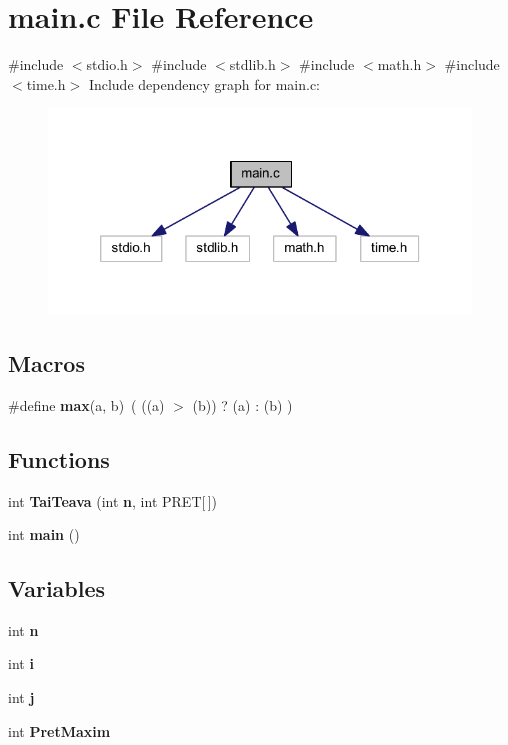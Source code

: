 \section{main.\+c File Reference}
\label{main_8c}
{\ttfamily \#include $<$stdio.\+h$>$}\newline
{\ttfamily \#include $<$stdlib.\+h$>$}\newline
{\ttfamily \#include $<$math.\+h$>$}\newline
{\ttfamily \#include $<$time.\+h$>$}\newline
Include dependency graph for main.\+c\+:
\nopagebreak
\begin{figure}[H]
\begin{center}
\leavevmode
\includegraphics[width=320pt]{main_8c__incl}
\end{center}
\end{figure}
\subsection*{Macros}
\begin{DoxyCompactItemize}
\item 
\#define \textbf{ max}(a,  b)~( ((a) $>$ (b)) ? (a) \+: (b) )
\end{DoxyCompactItemize}
\subsection*{Functions}
\begin{DoxyCompactItemize}
\item 
int \textbf{ Tai\+Teava} (int \textbf{ n}, int P\+R\+ET[$\,$])
\item 
int \textbf{ main} ()
\end{DoxyCompactItemize}
\subsection*{Variables}
\begin{DoxyCompactItemize}
\item 
int \textbf{ n}
\item 
int \textbf{ i}
\item 
int \textbf{ j}
\item 
int \textbf{ Pret\+Maxim}
\end{DoxyCompactItemize}


